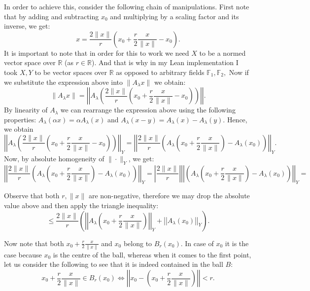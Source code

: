 \documentclass[11pt]{article}
\newcommand\R{\mathbb{R}}
\begin{document}
In order to achieve this, consider the following chain of manipulations.
First note that by adding and subtracting $x_0$ and multiplying by a scaling factor
and its inverse, we get:
 \[
x = \frac{2\|x\|}{r}\left( x_0 + \frac{r}{2}\frac{x}{\|x\|} - x_0 \right)
.\]
It is important to note that in order for this to work we need $X$ to be a normed
vector space over $\R$ (as  $r \in \R$). And that is why in my Lean implementation
I took $X, Y$ to be vector spaces over  $\R$ as opposed to arbitrary fields  $\mathbb{F}_1, \mathbb{F}_2,$
Now if we substitute the expression above into $\|A_\lambda x\|$ we obtain:
\[
\|A_\lambda x\| = \left|\left|A_\lambda\left(\frac{2\|x\|}{r}\left( x_0 + \frac{r}{2}\frac{x}{\|x\|} - x_0 \right)  \right) \right|\right|
.\]
By linearity of $A_\lambda$ we can rearrange the expression above using the following
properties: $A_\lambda\left( \alpha x \right) = \alpha A_\lambda\left( x \right)  $ and
$A_\lambda\left( x - y \right) = A_\lambda\left( x \right)  - A_\lambda\left( y \right)  $.
Hence, we obtain
\[
\left|\left|A_\lambda\left(\frac{2\|x\|}{r}\left( x_0 + \frac{r}{2}\frac{x}{\|x\|} - x_0 \right)  \right) \right|\right|_Y =
\left|\left| \frac{2\|x\|}{r} \left( A_\lambda\left( x_0 + \frac{r}{2}\frac{x}{\|x\|} \right) - A_\lambda(x_0)  \right) \right|\right|_Y
.\]
Now, by absolute homogeneity of $\|\cdot\|_Y$, we get:
\[
\left|\left| \frac{2\|x\|}{r} \left( A_\lambda\left( x_0 + \frac{r}{2}\frac{x}{\|x\|} \right) - A_\lambda(x_0)  \right) \right|\right|_Y =
\left| \frac{2\|x\|}{r} \right| \left|\left| \left( A_\lambda\left( x_0 + \frac{r}{2}\frac{x}{\|x\|} \right) - A_\lambda(x_0)  \right) \right|\right|_Y =
\]

Observe that both $ r, \|x\|$ are non-negative, therefore we may drop the absolute value above
and then apply the triangle inequality:
\begin{equation}
 \le \frac{2\|x\|}{r} \left( \left|\left| A_\lambda\left( x_0 + \frac{r}{2}\frac{x}{\|x\|} \right)
 \right|\right|_Y + \left|\left| A_\lambda(x_0)  \right|\right|_Y \right)
.\end{equation}

Now note that both $x_0 + \frac{r}{2}\frac{x}{\|x\|} $ and $x_0$ belong to $B_r(x_0)$.
In case of $x_0$ it is the case because $x_0$ is the centre of the ball, whereas when it comes to the first point, let us
consider the following to see that it is indeed contained in the ball  $B$:
\[
  x_0 + \frac{r}{2}\frac{x}{\|x\|} \in B_r(x_0) \iff \left|\left|x_0 - \left(x_0 + \frac{r}{2}\frac{x}{\|x\|}   \right) \right|\right| < r
.\]
\end{document}
